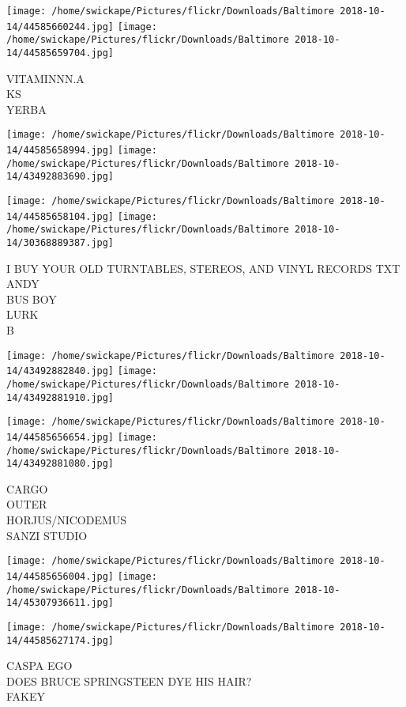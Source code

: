\documentclass[10pt,letterpaper]{article}
\begin{document}
\vspace{0.25in}
\texttt{[image: /home/swickape/Pictures/flickr/Downloads/Baltimore 2018-10-14/44585660244.jpg]}
\texttt{[image: /home/swickape/Pictures/flickr/Downloads/Baltimore 2018-10-14/44585659704.jpg]}

VITAMINNN.A\\
KS\\
YERBA\\
\pagebreak

\texttt{[image: /home/swickape/Pictures/flickr/Downloads/Baltimore 2018-10-14/44585658994.jpg]}
\texttt{[image: /home/swickape/Pictures/flickr/Downloads/Baltimore 2018-10-14/43492883690.jpg]}

\texttt{[image: /home/swickape/Pictures/flickr/Downloads/Baltimore 2018-10-14/44585658104.jpg]}
\texttt{[image: /home/swickape/Pictures/flickr/Downloads/Baltimore 2018-10-14/30368889387.jpg]}

I BUY YOUR OLD TURNTABLES, STEREOS, AND VINYL RECORDS TXT ANDY\\
BUS BOY\\
LURK\\
B\\
\pagebreak

\texttt{[image: /home/swickape/Pictures/flickr/Downloads/Baltimore 2018-10-14/43492882840.jpg]}
\texttt{[image: /home/swickape/Pictures/flickr/Downloads/Baltimore 2018-10-14/43492881910.jpg]}

\texttt{[image: /home/swickape/Pictures/flickr/Downloads/Baltimore 2018-10-14/44585656654.jpg]}
\texttt{[image: /home/swickape/Pictures/flickr/Downloads/Baltimore 2018-10-14/43492881080.jpg]}

CARGO\\
OUTER\\
HORJUS/NICODEMUS\\
SANZI STUDIO\\
\pagebreak

\texttt{[image: /home/swickape/Pictures/flickr/Downloads/Baltimore 2018-10-14/44585656004.jpg]}
\texttt{[image: /home/swickape/Pictures/flickr/Downloads/Baltimore 2018-10-14/45307936611.jpg]}

\texttt{[image: /home/swickape/Pictures/flickr/Downloads/Baltimore 2018-10-14/44585627174.jpg]}

CASPA EGO\\
DOES BRUCE SPRINGSTEEN DYE HIS HAIR?\\
FAKEY\\
\pagebreak
\end{document}
